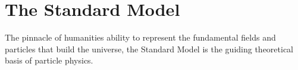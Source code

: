 \section{The Standard Model} \label{sec:theory:standardmodel}

The pinnacle of humanities ability to represent the fundamental fields and
particles that build the universe, the Standard Model is the guiding theoretical
basis of particle physics.

